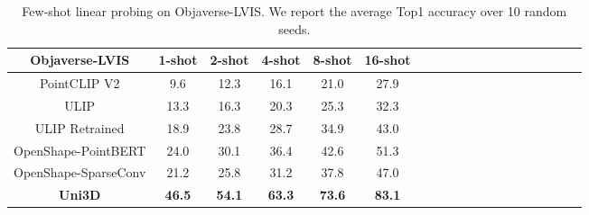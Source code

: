 \documentclass{article} \usepackage{iclr2024_conference,times}
\def\Ours{Uni3D\xspace}
\begin{document}
\begin{table}[t]
\centering
    \caption{Few-shot linear probing on Objaverse-LVIS. We report the average Top1 accuracy over 10 random seeds. 
}
\begin{tabular}{c|cccccccccccccccccc}
\toprule

Objaverse-LVIS & 1-shot & 2-shot & 4-shot & 8-shot & 16-shot \\
\midrule
PointCLIP V2 & 9.6&12.3&16.1&21.0&27.9\\
ULIP & 13.3& 16.3& 20.3& 25.3& 32.3 \\
ULIP Retrained & 18.9& 23.8& 28.7&34.9&43.0\\
OpenShape-PointBERT & 24.0& 30.1& 36.4& 42.6& 51.3 \\ 
OpenShape-SparseConv & 21.2& 25.8& 31.2& 37.8& 47.0 \\ 
\textbf{\Ours} & \textbf{46.5}& \textbf{54.1}& \textbf{63.3}& \textbf{73.6}& \textbf{83.1} \\



\bottomrule
\end{tabular}


\label{tab:fewshot}
\end{table}
\end{document}
